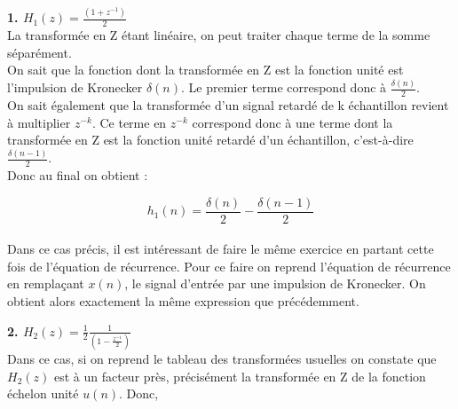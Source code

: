 \documentclass[11pt,a4paper]{article}
\begin{document}
\textbf{1. $H_1(z) = \frac{(1 + z^{-1})}{2}$}\\

La transformée en Z étant linéaire, on peut traiter chaque terme de la somme séparément.\\

On sait que la fonction dont la transformée en Z est la fonction unité est l'impulsion de Kronecker $\delta(n)$. Le premier terme correspond donc à $\frac{\delta(n)}{2}$.\\

On sait également que la transformée d'un signal retardé de k échantillon revient à multiplier $ z^{-k}$. Ce terme en $ z^{-k}$ correspond donc à une terme dont la transformée en Z est la fonction unité retardé d'un échantillon, c'est-à-dire $\frac{\delta(n-1)}{2}$.\\

Donc au final on obtient : 

\[h_1(n) = \frac{\delta(n)}{2} - \frac{\delta(n-1)}{2}\]\\

Dans ce cas précis, il est intéressant de faire le même exercice en partant cette fois de l'équation de récurrence. Pour ce faire on reprend l'équation de récurrence en remplaçant $x(n)$, le signal d'entrée par une impulsion de Kronecker. On obtient alors exactement la même expression que précédemment.\\ 

\begin{center}
\end{center}


\textbf{2. $H_2(z) = \frac{1}{2}\frac{1}{(1 - \frac{z^{-1}}{2})}$}\\

Dans ce cas, si on reprend le tableau des transformées usuelles on constate que $H_2(z)$ est à un facteur près, précisément la transformée en Z de la fonction échelon unité $u(n)$. Donc, 
\end{document}
